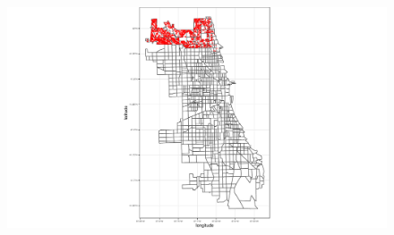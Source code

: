 \documentclass[
  shownotes,
  xcolor={svgnames},
  hyperref={colorlinks,citecolor=DarkBlue,linkcolor=DarkRed,urlcolor=DarkBlue}
  , aspectratio=169]{beamer}
\newenvironment{Shaded}{\begin{snugshade}}{\end{snugshade}}
\begin{document}
\begin{frame}[fragile]
\begin{minipage}[t]{0.48\linewidth}
\begin{itemize}
\begin{Shaded}
      \end{Shaded}
       \end{itemize} 
    \end{minipage}
    \hfill
    \begin{minipage}[t]{0.48\linewidth}%
    \bigskip
        \begin{figure}[H] \centering
            \captionsetup{justification=centering}  
            \includegraphics[scale=0.35]{figures/chicago.pdf}
    \end{figure}
    \end{minipage}
\end{frame}
\end{document}
